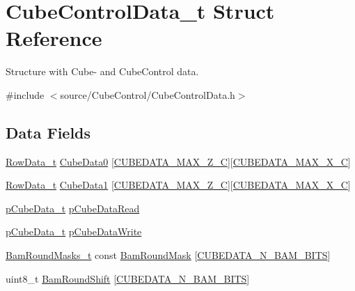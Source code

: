 \hypertarget{struct_cube_control_data__t}{}\section{Cube\+Control\+Data\+\_\+t Struct Reference}
\label{struct_cube_control_data__t}


Structure with Cube-\/ and Cube\+Control data.  




{\ttfamily \#include $<$source/\+Cube\+Control/\+Cube\+Control\+Data.\+h$>$}

\subsection*{Data Fields}
\begin{DoxyCompactItemize}
\item 
\hyperlink{struct_row_data__t}{Row\+Data\+\_\+t} \hyperlink{struct_cube_control_data__t_a4fcbd72fab1f862e17acc3f96efe8d4c}{Cube\+Data0} \mbox{[}\hyperlink{_cube_control_data_8h_af8a3cd66f1181d1c4119a4e51a4015f8}{C\+U\+B\+E\+D\+A\+T\+A\+\_\+\+M\+A\+X\+\_\+\+Z\+\_\+\+C}\mbox{]}\mbox{[}\hyperlink{_cube_control_data_8h_aaf8754e50e21c648edd86850eedb5a63}{C\+U\+B\+E\+D\+A\+T\+A\+\_\+\+M\+A\+X\+\_\+\+X\+\_\+\+C}\mbox{]}
\item 
\hyperlink{struct_row_data__t}{Row\+Data\+\_\+t} \hyperlink{struct_cube_control_data__t_a647ae59f9e5f0842d92ef0241db2a141}{Cube\+Data1} \mbox{[}\hyperlink{_cube_control_data_8h_af8a3cd66f1181d1c4119a4e51a4015f8}{C\+U\+B\+E\+D\+A\+T\+A\+\_\+\+M\+A\+X\+\_\+\+Z\+\_\+\+C}\mbox{]}\mbox{[}\hyperlink{_cube_control_data_8h_aaf8754e50e21c648edd86850eedb5a63}{C\+U\+B\+E\+D\+A\+T\+A\+\_\+\+M\+A\+X\+\_\+\+X\+\_\+\+C}\mbox{]}
\item 
\hyperlink{struct_row_data__t}{p\+Cube\+Data\+\_\+t} \hyperlink{struct_cube_control_data__t_a981fbbdd6a05af493c7ae6782bdcb9af}{p\+Cube\+Data\+Read}
\item 
\hyperlink{struct_row_data__t}{p\+Cube\+Data\+\_\+t} \hyperlink{struct_cube_control_data__t_aa60f6c5f56c138fba459e0a990248e0f}{p\+Cube\+Data\+Write}
\item 
\hyperlink{_cube_control_data_8h_a2b6850a8815b785ea51f17c4d979706e}{Bam\+Round\+Masks\+\_\+t} const \hyperlink{struct_cube_control_data__t_a27e68e649dcb5beced5b6b7c92419ec5}{Bam\+Round\+Mask} \mbox{[}\hyperlink{_cube_control_data_8h_ae8163b1995363e0daae4ac54ee4d1dd9}{C\+U\+B\+E\+D\+A\+T\+A\+\_\+\+N\+\_\+\+B\+A\+M\+\_\+\+B\+I\+T\+S}\mbox{]}
\item 
uint8\+\_\+t \hyperlink{struct_cube_control_data__t_a945206c33a16ec4249c30e2b698dccff}{Bam\+Round\+Shift} \mbox{[}\hyperlink{_cube_control_data_8h_ae8163b1995363e0daae4ac54ee4d1dd9}{C\+U\+B\+E\+D\+A\+T\+A\+\_\+\+N\+\_\+\+B\+A\+M\+\_\+\+B\+I\+T\+S}\mbox{]}
\end{DoxyCompactItemize}


